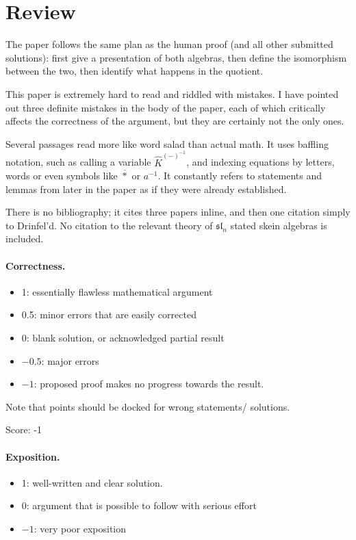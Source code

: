\documentclass[11pt]{article}
\theoremstyle{definition}
\theoremstyle{remark}
\begin{document}
\maketitle

\section{Review}


The paper follows the same plan as the human proof (and all other submitted solutions): first give a presentation of both algebras, then define the isomorphism between the two, then identify what happens in the quotient.

This paper is extremely hard to read and riddled with mistakes. I have pointed out three definite mistakes in the body of the paper, each of which critically affects the correctness of the argument, but they are certainly not the only ones. 

Several passages read more like word salad than actual math. It uses baffling notation, such as calling a variable $\hat{K}^{(-)^{-1}}$, and indexing equations by letters, words or even symbols like $\overline{*}$ or $a^{-1}$. It constantly refers to statements and lemmas from later in the paper as if they were already established.

There is no bibliography; it cites three papers inline, and then one citation simply to Drinfel'd. No citation to the relevant theory of $\mathfrak{sl}_n$ stated skein algebras is included.

\paragraph{Correctness.}
\begin{itemize}
	\item  1: essentially flawless mathematical argument
	\item  0.5: minor errors that are easily corrected
	\item  0: blank solution, or acknowledged partial result
	\item  $-0.5$: major errors
	\item  $-1$: proposed proof makes no progress towards the result.
\end{itemize}
Note that points should be docked for wrong statements/ solutions.

\noindent Score: -1

\paragraph{Exposition.}
\begin{itemize}
	\item  1: well-written and clear solution.
	\item  0: argument that is possible to follow with serious effort
	\item  $-1$: very poor exposition
\end{itemize}
\end{document}
